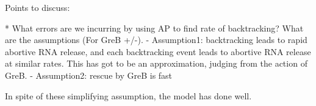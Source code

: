 Points to discuss:

* What errors are we incurring by using AP to find rate of backtracking? What
are the assumptions (For GreB +/-).
    - Assumption1: backtracking leads to rapid abortive RNA release, and each
    backtracking event leads to abortive RNA release at similar rates. This
    has got to be an approximation, judging from the action of GreB.
    - Assumption2: rescue by GreB is fast

In spite of these simplifying assumption, the model has done well.
